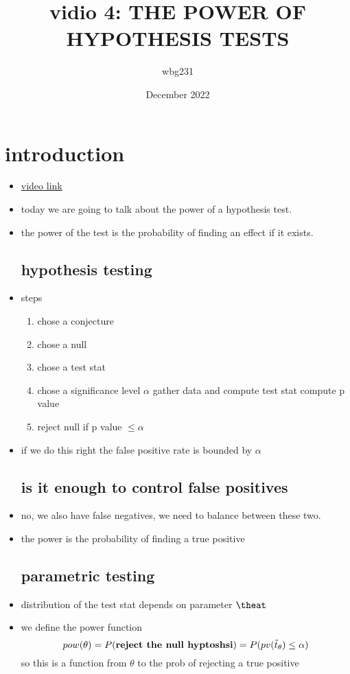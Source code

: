 \documentclass{article}
\title{vidio 4: THE POWER OF HYPOTHESIS TESTS}
\author{wbg231 }
\date{December 2022}
\begin{document}
\maketitle

\section{introduction}
\begin{itemize}
\item \href{https://www.youtube.com/watch?v=CfWdLJm7ObE&list=PLBEf5mJtE6KuZ5NBQMuWIMsiOOrV9ibzm&index=81&ab_channel=CarlosFernandez-Granda}{video link }
\item today we are going to talk about the power of a hypothesis test. 
\item the power of the test is the probability of finding an effect if it exists. 
\subsection{hypothesis testing}
\item steps 
\begin{enumerate}
    \item chose a  conjecture 
    \item chose a null 
    \item chose a test stat 
    \item chose a significance level $\alpha$
    \itme gather data and compute test stat 
    \itme compute p value 
    \item reject null if p value $\leq \alpha$
\end{enumerate}
\item if we do this right the false positive rate is bounded by $\alpha$
\subsection{is it enough to control false positives}
\item no, we also have false negatives, we need to balance between these two.
\item the power is the probability of finding a true positive
\subsection{parametric testing }
\item distribution of the test stat depends on parameter $\theat$
\item we define the power function $$pow(\theta)=P(\textbf{reject the null hyptoshsi})=P(pv(\Tilde{t}_{\theta})\leq \alpha)$$ so this is a function from $\theta$ to the prob of rejecting a true positive 

\end{itemize}
\end{document}
